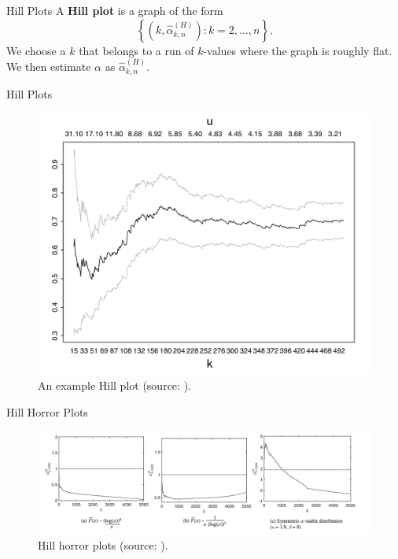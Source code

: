 \documentclass{beamer}
\begin{document}
\begin{frame}{Hill Plots}
    A \textbf{Hill plot} is a graph of the form
    \[
    \left\{\left(k, \hat{\alpha}_{k, n}^{(H)}\right) : k = 2, \ldots, n\right\}.
    \]
    We choose a $k$ that belongs to a run of $k$-values where the graph is roughly flat. We then estimate $\alpha$ as $\hat{\alpha}_{k, n}^{(H)}$.
\end{frame}

\begin{frame}{Hill Plots}
    \begin{figure}
        \centering
        \includegraphics[scale=0.35]{hill_plot.png}
        \caption{An example Hill plot (source: \cite{embrechts_et_al_1997}).}
        \label{fig:hill_plot}
    \end{figure}
\end{frame}

\begin{frame}{Hill Horror Plots}
    \begin{figure}
        \centering
        \includegraphics[scale=0.3]{hill_horror_plots1.png}
        \caption{Hill horror plots (source: \cite{nair_et_al_2022}).}
        \label{fig:hill_horror_plots1}
    \end{figure}
\end{frame}
\end{document}
